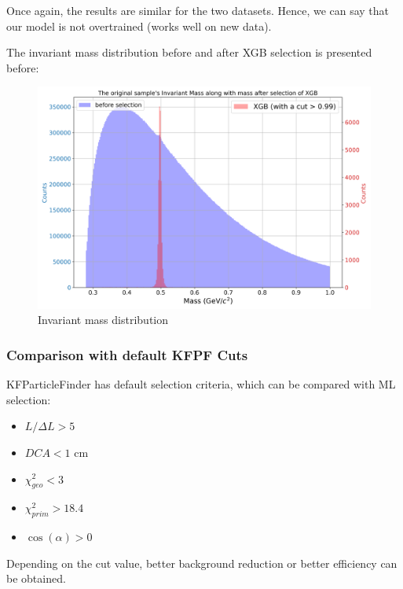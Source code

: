Once again, the results are similar for the two datasets. Hence, we can say that our model is not overtrained (works well on new data).

The invariant mass distribution before and after XGB selection is presented before:
\begin{figure}[h!]
    \centering
    \includegraphics[width=.9\textwidth]{img/cut_visualization.png}
    \caption{Invariant mass distribution}
\end{figure}


\subsubsection{Comparison with default KFPF Cuts}
KFParticleFinder has default selection criteria, which can be compared with ML selection:
\begin{itemize}
    \item $L/\Delta L > 5 $
    \item $DCA < 1 $ cm
    \item $\chi^2_{geo} < 3 $
    \item $\chi^2_{prim} > 18.4 $
    \item $\cos(\alpha) > 0 $
\end{itemize}
Depending on the cut value,  better background reduction or better efficiency can be obtained.

